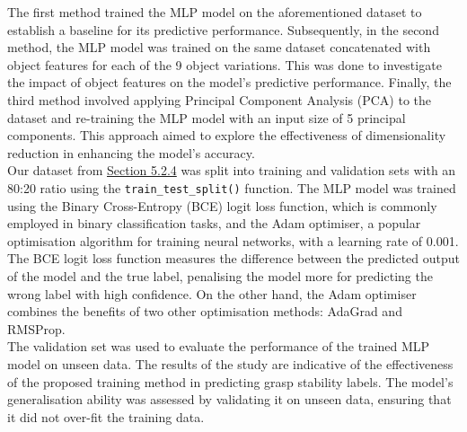 \documentclass[11pt, a4paper]{report}
\begin{document}
The first method trained the MLP model on the aforementioned dataset to establish a baseline for its predictive performance. Subsequently, in the second method, the MLP model was trained on the same dataset concatenated with object features for each of the 9 object variations. This was done to investigate the impact of object features on the model's predictive performance. Finally, the third method involved applying Principal Component Analysis (PCA) to the dataset and re-training the MLP model with an input size of 5 principal components. This approach aimed to explore the effectiveness of dimensionality reduction in enhancing the model's accuracy.\\

Our dataset from \hyperref[sec:5.2.4]{Section 5.2.4} was split into training and validation sets with an 80:20 ratio using the \verb|train_test_split()| function. The MLP model was trained using the Binary Cross-Entropy (BCE) logit loss function, which is commonly employed in binary classification tasks, and the Adam optimiser, a popular optimisation algorithm for training neural networks, with a learning rate of 0.001. The BCE logit loss function measures the difference between the predicted output of the model and the true label, penalising the model more for predicting the wrong label with high confidence. On the other hand, the Adam optimiser combines the benefits of two other optimisation methods: AdaGrad and RMSProp.\\

The validation set was used to evaluate the performance of the trained MLP model on unseen data. The results of the study are indicative of the effectiveness of the proposed training method in predicting grasp stability labels. The model's generalisation ability was assessed by validating it on unseen data, ensuring that it did not over-fit the training data.\\
\end{document}
